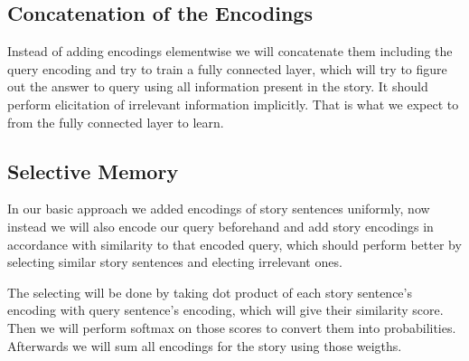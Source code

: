 \documentclass[conference,compsoc]{IEEEtran}
\begin{document}
\subsection{Concatenation of the Encodings}
Instead of adding encodings elementwise we will concatenate them including the
query encoding and try to train a fully connected layer, which will try to 
figure out the answer to query using all information present in the story.
It should perform elicitation of irrelevant information implicitly. That is
what we expect to from the fully connected layer to learn.


\subsection{Selective Memory}
In our basic approach we added encodings of story sentences uniformly, now instead
we will also encode our query beforehand and add story encodings in accordance with
similarity to that encoded query, which should perform better by selecting similar
story sentences and electing irrelevant ones.

The selecting will be done by taking dot product of each story sentence's encoding
with query sentence's encoding, which will give their similarity score. Then we 
will perform softmax on those scores to convert them into probabilities. Afterwards
we will sum all encodings for the story using those weigths.
\end{document}
